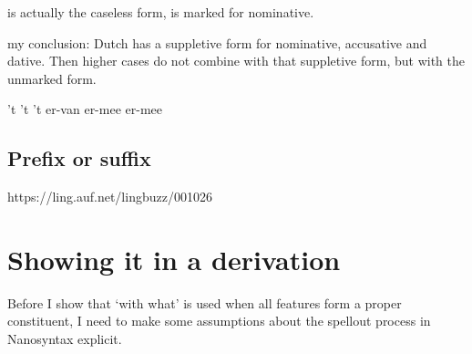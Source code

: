 \documentclass[12pt]{article}
\begin{document}
 is actually the caseless form,  is marked for nominative.


my conclusion: Dutch has a suppletive form for nominative, accusative and dative. Then higher cases do not combine with that suppletive form, but with the unmarked form.

't
't
't
er-van
er-mee
er-mee








\subsection{Prefix or suffix}

https://ling.auf.net/lingbuzz/001026









%
%
%
%
%
%


\section{Showing it in a derivation}

Before I show that  `with what' is used when all features form a proper constituent, I need to make some assumptions about the spellout process in Nanosyntax explicit.
\end{document}
